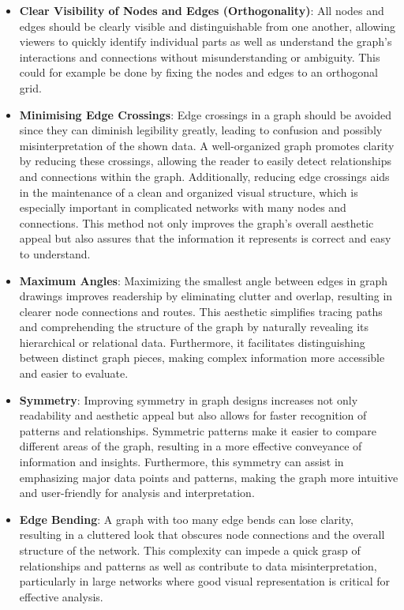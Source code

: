 \documentclass[bachelor, english]{algothesis}
\begin{document}
\begin{itemize}
    \item \textbf{Clear Visibility of Nodes and Edges (Orthogonality)}: All nodes and edges should be clearly visible and distinguishable from one another, allowing viewers to quickly identify individual parts as well as understand the graph's interactions and connections without misunderstanding or ambiguity. This could for example be done by fixing the nodes and edges to an orthogonal grid.
    \item \textbf{Minimising Edge Crossings}: Edge crossings in a graph should be avoided since they can diminish legibility greatly, leading to confusion and possibly misinterpretation of the shown data. A well-organized graph promotes clarity by reducing these crossings, allowing the reader to easily detect relationships and connections within the graph. Additionally, reducing edge crossings aids in the maintenance of a clean and organized visual structure, which is especially important in complicated networks with many nodes and connections. This method not only improves the graph's overall aesthetic appeal but also assures that the information it represents is correct and easy to understand.
    \item \textbf{Maximum Angles}: Maximizing the smallest angle between edges in graph drawings improves readership by eliminating clutter and overlap, resulting in clearer node connections and routes. This aesthetic simplifies tracing paths and comprehending the structure of the graph by naturally revealing its hierarchical or relational data. Furthermore, it facilitates distinguishing between distinct graph pieces, making complex information more accessible and easier to evaluate.
    \item \textbf{Symmetry}: Improving symmetry in graph designs increases not only readability and aesthetic appeal but also allows for faster recognition of patterns and relationships. Symmetric patterns make it easier to compare different areas of the graph, resulting in a more effective conveyance of information and insights. Furthermore, this symmetry can assist in emphasizing major data points and patterns, making the graph more intuitive and user-friendly for analysis and interpretation.
    \item \textbf{Edge Bending}: A graph with too many edge bends can lose clarity, resulting in a cluttered look that obscures node connections and the overall structure of the network. This complexity can impede a quick grasp of relationships and patterns as well as contribute to data misinterpretation, particularly in large networks where good visual representation is critical for effective analysis.
\end{itemize}
\end{document}
